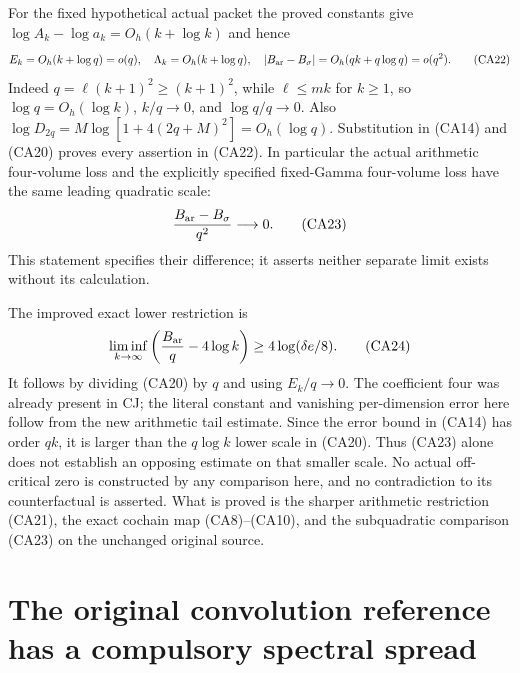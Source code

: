 For the fixed hypothetical actual packet the proved constants give
$\log A_k-\log a_k=O_h(k+\log k)$ and hence
\[
 E_k=O_h(k+\log q)=o(q),\quad
 \Lambda_k=O_h(k+\log q),\quad
 |B_{\rm ar}-B_\sigma|=O_h(qk+q\log q)=o(q^2).
 \tag{CA22}
\]
Indeed $q=\ell(k+1)^2\ge(k+1)^2$, while $\ell\le mk$ for $k\ge1$,
so $\log q=O_h(\log k)$, $k/q\to0$, and $\log q/q\to0$.
Also $\log D_{2q}=M\log[1+4(2q+M)^2]=O_h(\log q)$.
Substitution in (CA14) and (CA20) proves every assertion in (CA22).
In particular the actual arithmetic four-volume loss and the explicitly
specified fixed-Gamma four-volume loss have the same leading quadratic
scale:
\[
 \frac{B_{\rm ar}-B_\sigma}{q^2}\longrightarrow0.
 \tag{CA23}
\]
This statement specifies their difference; it asserts neither separate
limit exists without its calculation.

The improved exact lower restriction is
\[
 \liminf_{k\to\infty}\left(\frac{B_{\rm ar}}q-4\log k\right)
 \ge4\log(\delta e/8).
 \tag{CA24}
\]
It follows by dividing (CA20) by $q$ and using $E_k/q\to0$.
The coefficient four was already present in CJ; the literal constant
and vanishing per-dimension error here follow from the new arithmetic
tail estimate.  Since the error bound in (CA14) has order $qk$, it is
larger than the $q\log k$ lower scale in (CA20).  Thus (CA23) alone
does not establish an opposing estimate on that smaller scale.
No actual off-critical zero is constructed by any comparison here,
and no contradiction to its counterfactual is asserted.  What is proved
is the sharper arithmetic restriction (CA21), the exact cochain map
(CA8)--(CA10), and the subquadratic comparison (CA23) on the unchanged
original source.

\section{The original convolution reference has a compulsory spectral spread}

